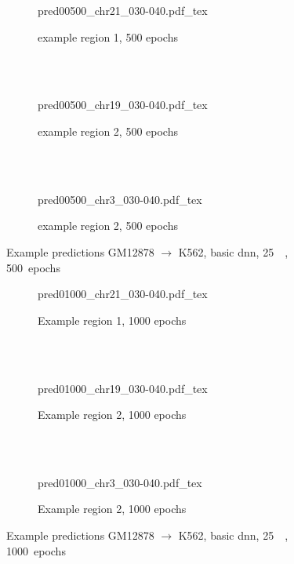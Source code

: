 \begin{figure}[p]
    \begin{subfigure}{\textwidth}
        \centering
        \scriptsize
        {pred00500_chr21_030-040.pdf_tex}
        \caption{example  region 1, 500 epochs} \label{fig:results:basic_r1}
    \end{subfigure}\\[2mm]
    \\[3mm]
    \begin{subfigure}{\textwidth}
        \centering
        \scriptsize
        {pred00500_chr19_030-040.pdf_tex}
        \caption{example region 2, 500 epochs} \label{fig:results:basic_r2}
    \end{subfigure}\\[2mm]
    \\[3mm]
    \begin{subfigure}{\textwidth}
        \centering
        \scriptsize
        {pred00500_chr3_030-040.pdf_tex}
        \caption{example region 2, 500 epochs} \label{fig:results:basic_r3}
    \end{subfigure}
    \caption{Example predictions GM12878 $\rightarrow$ K562, basic \acrshort{dnn}, \SI{25}{\kilo\bp}, 500~epochs} \label{fig:results:basic500}
\end{figure}
\begin{figure}[p]
    \begin{subfigure}{\textwidth}
        \centering
        \scriptsize
        {pred01000_chr21_030-040.pdf_tex}
        \caption{Example region 1, 1000 epochs} \label{fig:results:basic_r1_1000}
    \end{subfigure}\\[2mm]
    \\[3mm]
    \begin{subfigure}{\textwidth}
        \centering
        \scriptsize
        {pred01000_chr19_030-040.pdf_tex}
        \caption{Example region 2, 1000 epochs} \label{fig:results:basic_r2_1000}
    \end{subfigure}\\[2mm]
    \\[3mm]
    \begin{subfigure}{\textwidth}
        \centering
        \scriptsize
        {pred01000_chr3_030-040.pdf_tex}
        \caption{Example region 2, 1000 epochs} \label{fig:results:basic_r3_1000}
    \end{subfigure}
    \caption{Example predictions GM12878 $\rightarrow$ K562, basic \acrshort{dnn}, \SI{25}{\kilo\bp}, 1000~epochs} \label{fig:results:basic1000}
\end{figure}
